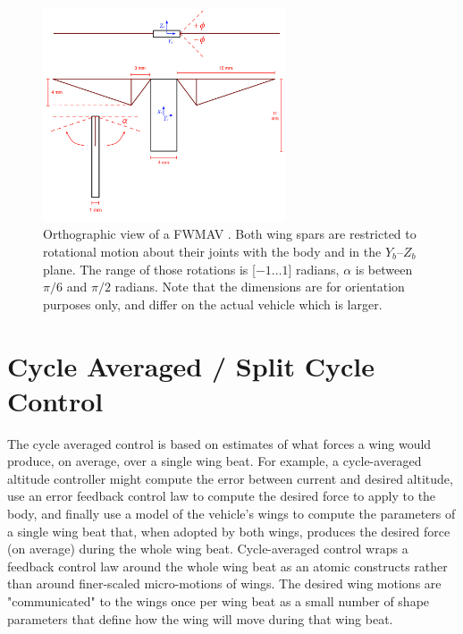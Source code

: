 \begin{figure}
\centering
\includegraphics[width=0.64\textwidth]{Files/Figures/fwmav.png}
\caption[Orthographic view of flapping wing vehicle]{Orthographic view of a FWMAV \cite{gallagher}. Both wing spars are restricted to rotational motion about their joints with the body and in the $Y_b$--$Z_b$ plane. The range of those rotations is [$-1\ldots1$] radians, $\alpha$ is between $\pi/6$ and $\pi/2$ radians. Note that the dimensions are for orientation purposes only, and differ on the actual vehicle which is larger.}
\label{fig:fwmav}
\end{figure}

\section{Cycle Averaged / Split Cycle Control}
\label{sec-splitCycleControl}

The cycle averaged control is based on estimates of what forces a wing would produce, on average, over a single wing beat. For example, a cycle-averaged altitude controller might compute the error between current and desired altitude, use an error feedback control law to compute the desired force to apply to the body, and finally use a model of the vehicle's wings to compute the parameters of a single wing beat that, when adopted by both wings, produces the desired force (on average) during the whole wing beat. Cycle-averaged control wraps a feedback control law around the whole wing beat as an atomic constructs rather than around finer-scaled micro-motions of wings. The desired wing motions are "communicated" to the wings once per wing beat as a small number of shape parameters that define how the wing will move during that wing beat.

